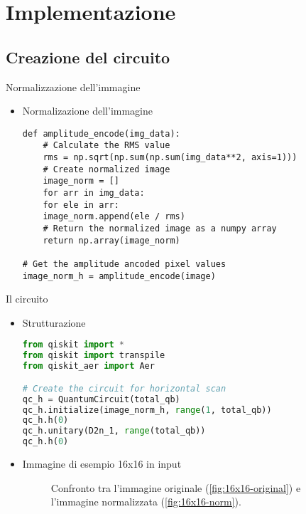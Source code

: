 \section{Implementazione}

\subsection{Creazione del circuito}

\begin{frame}[fragile]{Normalizzazione dell'immagine}
	\begin{itemize}
		\item Normalizazione dell'immagine
		\begin{lstlisting}
def amplitude_encode(img_data):
	# Calculate the RMS value
	rms = np.sqrt(np.sum(np.sum(img_data**2, axis=1)))
	# Create normalized image
	image_norm = []
	for arr in img_data:
	for ele in arr:
	image_norm.append(ele / rms)
	# Return the normalized image as a numpy array
	return np.array(image_norm)

# Get the amplitude ancoded pixel values
image_norm_h = amplitude_encode(image)
		\end{lstlisting}
	\end{itemize}
\end{frame}

\begin{frame}[fragile]{Il circuito}
	\begin{itemize}
		\item Strutturazione
		\begin{lstlisting}[language=Python]
from qiskit import *
from qiskit import transpile
from qiskit_aer import Aer

# Create the circuit for horizontal scan
qc_h = QuantumCircuit(total_qb)
qc_h.initialize(image_norm_h, range(1, total_qb))
qc_h.h(0)
qc_h.unitary(D2n_1, range(total_qb))
qc_h.h(0)
		\end{lstlisting}
	\end{itemize}
\end{frame}

\begin{frame}[fragile]
	\begin{itemize}
		\item Immagine di esempio 16x16 in input
		\begin{figure}
			\centering
			\hfill
			\caption{Confronto tra l'immagine originale (\ref{fig:16x16-original}) e l'immagine normalizzata (\ref{fig:16x16-norm}).}
		\end{figure}
	\end{itemize}
\end{frame}


